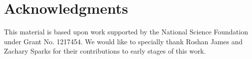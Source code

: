 \documentclass[11pt]{article}
\begin{document}
\section*{Acknowledgments}

This material is based upon work supported by the National Science Foundation
under Grant No. 1217454. We would like to specially thank Roshan James and
Zachary Sparks for their contributions to early stages of this work. 



\end{document}
